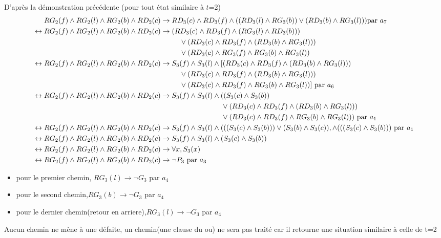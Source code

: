 \documentclass{article}
\begin{document}
D'après la démonstration précédente (pour tout état similaire à $t$=2)\\
\begin{align*}
    RG_2(f) \wedge RG_2(l) \wedge RG_2(b) \wedge RD_2(c)& \to RD_3(c) \wedge RD_3(f) \wedge ((RD_3(l)\wedge RG_3(b))\vee (RD_3(b)\wedge RG_3(l))) \text {par } a_7\\
    \leftrightarrow RG_2(f) \wedge RG_2(l) \wedge RG_2(b) \wedge RD_2(c)& \to (RD_3(c)\wedge RD_3(f)\wedge (RG_3(l)\wedge RD_3(b)))\\
    & \hphantom{aaaaa}\vee (RD_3(c)\wedge RD_3(f)\wedge (RD_3(b)\wedge RG_3(l)))\\
    & \hphantom{aaaaa}\vee (RD_3(c) \wedge RG_3(f) \wedge RG_3(b) \wedge RG_3(l))\\
    \leftrightarrow RG_2(f) \wedge RG_2(l) \wedge RG_2(b) \wedge RD_2(c)& \to S_3(f) \wedge S_3(l) \wedge [(RD_3(c)\wedge RD_3(f)\wedge (RD_3(b)\wedge RG_3(l)))  \\
    & \hphantom{aaaaa} \vee (RD_3(c)\wedge RD_3(f)\wedge (RD_3(b)\wedge RG_3(l)))\\
    & \hphantom{aaaaa}\vee (RD_3(c) \wedge RD_3(f) \wedge RG_3(b) \wedge RG_3(l))]\text{ par }a_6\\
     \leftrightarrow RG_2(f) \wedge RG_2(l) \wedge RG_2(b) \wedge RD_2(c)& \to S_3(f) \wedge S_3(l) \wedge ((S_3(c)\wedge S_3(b))\\
    &\hphantom{aaaaaaaaaaaaaaaa}\vee (RD_3(c)\wedge RD_3(f)\wedge (RD_3(b)\wedge RG_3(l)))\\
    &\hphantom{aaaaaaaaaaaaaaaa}\vee (RD_3(c) \wedge RD_3(f) \wedge RG_3(b) \wedge RG_3(l)))\text{ par } a_1\\
    \leftrightarrow RG_2(f) \wedge RG_2(l) \wedge RG_2(b) \wedge RD_2(c)& \to S_3(f) \wedge S_3(l) \wedge (((S_3(c)\wedge S_3(b))) \vee (S_3(b)\wedge S_3(c)),\wedge (((S_3(c)\wedge S_3(b)))\text{ par } a_1\\
    \leftrightarrow RG_2(f) \wedge RG_2(l) \wedge RG_2(b) \wedge RD_2(c)& \to S_3(f) \wedge S_3(l) \wedge (S_3(c)\wedge S_3(b))\\
    \leftrightarrow RG_2(f) \wedge RG_2(l) \wedge RG_2(b) \wedge RD_2(c)& \to \forall x, S_3(x)\\
    \leftrightarrow RG_2(f) \wedge RG_2(l) \wedge RG_2(b) \wedge RD_2(c)& \to \neg P_3 \text{ par } a_3
\end{align*}

\begin{itemize}
  \item pour le premier chemin, $RG_3(l) \to \neg G_3$ par $a_4$
  \item pour le second chemin,$RG_3(b) \to \neg G_3$ par $a_4$
  \item pour le dernier chemin(retour en arriere),$RG_3(l) \to \neg G_3$ par $a_4$
\end{itemize}
Aucun chemin ne mène à une défaite, un chemin(une clause du ou) ne sera pas traité car il retourne une situation similaire à celle de t=2
\end{document}
